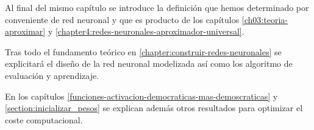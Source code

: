 Al final del mismo capítulo se introduce la definición que hemos determinado por conveniente de red neuronal y que es producto de los capítulos 
\ref{ch03:teoria-aproximar} y \ref{chapter4:redes-neuronales-aproximador-universal}.
 
Tras todo el fundamento teórico en \ref{chapter:construir-redes-neuronales} se explicitará el diseño de la red neuronal modelizada así como los algoritmo de evaluación y aprendizaje.

En los capítulos \ref{funciones-activacion-democraticas-mas-demoscraticas} y \ref{section:inicializar_pesos} se explican además otros resultados para optimizar el coste computacional.